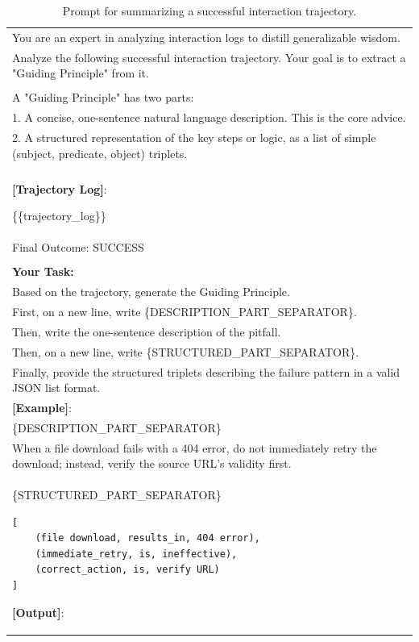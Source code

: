 \begin{table}[h]
  \centering
  \small
  \label{tab:success_distill_prompt}
  \caption{Prompt for summarizing a successful interaction trajectory.}
  \begin{tabular}{p{}}
    \toprule
You are an expert in analyzing interaction logs to distill generalizable wisdom.\\

Analyze the following successful interaction trajectory. Your goal is to extract a "Guiding Principle" from it.\\ \\

A "Guiding Principle" has two parts:\\
1. A concise, one-sentence natural language description. This is the core advice.\\
2. A structured representation of the key steps or logic, as a list of simple (subject, predicate, object) triplets.\\ \\

\textbf{[Trajectory Log]}: 

\{\{trajectory\_log\}\} \\
Final Outcome: SUCCESS\\ \\

\textbf{Your Task:}\\
Based on the trajectory, generate the Guiding Principle.\\
First, on a new line, write \{DESCRIPTION\_PART\_SEPARATOR\}.\\
Then, write the one-sentence description of the pitfall.\\
Then, on a new line, write \{STRUCTURED\_PART\_SEPARATOR\}.\\
Finally, provide the structured triplets describing the failure pattern in a valid JSON list format.\\[0.5em]

\textbf{[Example]}:\\
\{DESCRIPTION\_PART\_SEPARATOR\}\\
When a file download fails with a 404 error, do not immediately retry the download; instead, verify the source URL's validity first.\\
\{STRUCTURED\_PART\_SEPARATOR\}  
\begin{verbatim}
[
    (file download, results_in, 404 error),
    (immediate_retry, is, ineffective),
    (correct_action, is, verify URL)
]
\end{verbatim}
\textbf{[Output]}:\\
    \bottomrule
  \end{tabular}
\end{table}


